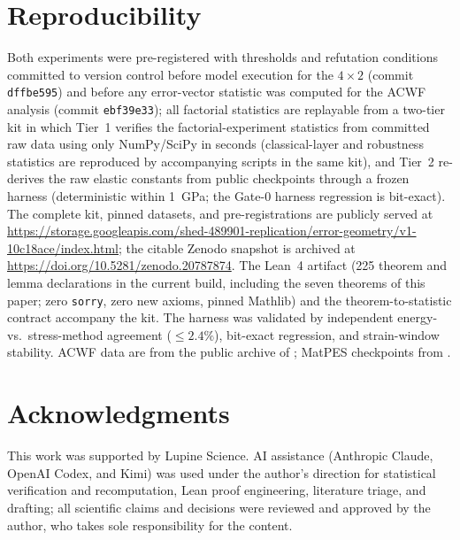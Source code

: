 \documentclass[11pt]{article}
\begin{document}
\section{Reproducibility}
\label{sec:repro}

Both experiments were pre-registered with thresholds and refutation
conditions committed to version control before model execution for the
$4{\times}2$ (commit \texttt{dffbe595}) and before any error-vector statistic
was computed for the ACWF analysis (commit \texttt{ebf39e33}); all factorial
statistics are replayable from a two-tier kit in which Tier~1 verifies the
factorial-experiment statistics from committed raw data using only
NumPy/SciPy in seconds (classical-layer and robustness statistics are
reproduced by accompanying scripts in the same kit), and Tier~2 re-derives
the raw elastic constants from public checkpoints through a frozen harness
(deterministic within 1~GPa; the Gate-0 harness regression is bit-exact).
The complete kit, pinned datasets, and pre-registrations are publicly served at
\url{https://storage.googleapis.com/shed-489901-replication/error-geometry/v1-10c18ace/index.html};
the citable Zenodo snapshot is archived at
\url{https://doi.org/10.5281/zenodo.20787874}. The Lean~4 artifact (225 theorem
and lemma declarations in the current build, including the seven theorems of
this paper; zero \texttt{sorry}, zero new axioms, pinned Mathlib) and the
theorem-to-statistic contract accompany the kit. The harness was validated by
independent energy- vs.\ stress-method agreement ($\le 2.4\%$), bit-exact
regression, and strain-window stability. ACWF data are from the public
archive of \citet{bosoni2024}; MatPES checkpoints from \citet{kaplan2025}.

\section*{Acknowledgments}
This work was supported by Lupine Science. AI assistance (Anthropic Claude,
OpenAI Codex, and Kimi) was used under the author's direction for statistical
verification and recomputation, Lean proof engineering, literature triage, and
drafting; all scientific claims and decisions were reviewed and approved by the
author, who takes sole responsibility for the content.



\end{document}
